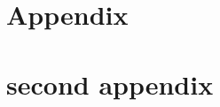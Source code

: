 \documentclass[a4paper]{scrartcl}
\begin{document}
	
	
	
	
	
	
	
	
	
	
	
	
	

	\pagebreak
	\printbibliography
	
	\appendix
	\section{Appendix}\label{appendix}
	
		
	
	\pagebreak
	\section{second appendix}\label{appendix_2}
		
		
\end{document}
